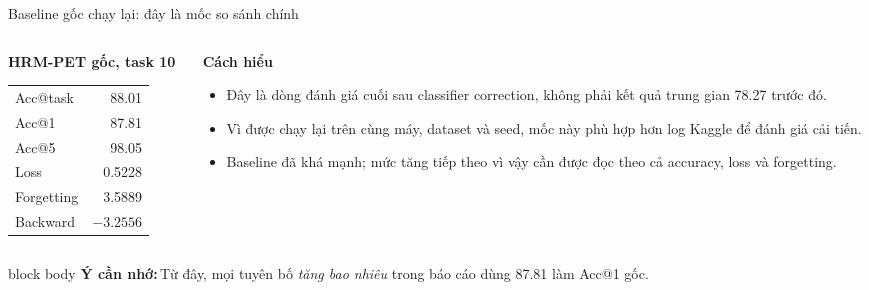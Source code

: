 \documentclass[aspectratio=169,10pt]{beamer}
\newcommand{\remember}[1]{%
  \par\vspace{0.12cm}%
  \begin{beamercolorbox}[wd=\linewidth,sep=0.11cm,leftskip=0.08cm,rightskip=0.08cm,rounded=true]{block body}
    \footnotesize\textbf{\color{HRMBlue}Ý cần nhớ:}\,\color{HRMDark}#1
  \end{beamercolorbox}
}
\begin{document}
\begin{frame}{Baseline gốc chạy lại: đây là mốc so sánh chính}
  \begin{columns}[T,onlytextwidth]
    \begin{column}{0.47\textwidth}
      {\large\bfseries HRM-PET gốc, task 10}\par\vspace{0.2cm}
      \begin{tabular}{lr}
        Acc@task & 88.01 \\
        Acc@1 & 87.81 \\
        Acc@5 & 98.05 \\
        Loss & 0.5228 \\
        Forgetting & 3.5889 \\
        Backward & $-3.2556$ \\
      \end{tabular}
    \end{column}
    \begin{column}{0.49\textwidth}
      {\large\bfseries Cách hiểu}\par\vspace{0.2cm}
      \begin{itemize}\setlength\itemsep{0.24cm}
        \item Đây là dòng đánh giá cuối sau classifier correction, không phải kết quả trung gian 78.27 trước đó.
        \item Vì được chạy lại trên cùng máy, dataset và seed, mốc này phù hợp hơn log Kaggle để đánh giá cải tiến.
        \item Baseline đã khá mạnh; mức tăng tiếp theo vì vậy cần được đọc theo cả accuracy, loss và forgetting.
      \end{itemize}
    \end{column}
  \end{columns}
  \remember{Từ đây, mọi tuyên bố \emph{tăng bao nhiêu} trong báo cáo dùng 87.81 làm Acc@1 gốc.}
\end{frame}
\end{document}
